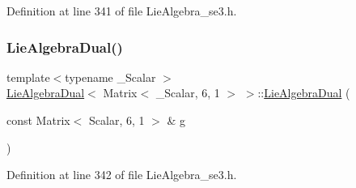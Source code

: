 Definition at line 341 of file Lie\+Algebra\+\_\+se3.\+h.

\hypertarget{class_lie_algebra_dual_3_01_matrix_3_01___scalar_00_016_00_011_01_4_01_4_a6250264c65f7681975a5683570e258e1}{}\label{class_lie_algebra_dual_3_01_matrix_3_01___scalar_00_016_00_011_01_4_01_4_a6250264c65f7681975a5683570e258e1} 
\subsubsection{\texorpdfstring{Lie\+Algebra\+Dual()}{LieAlgebraDual()}\hspace{0.1cm}{\footnotesize\ttfamily [3/5]}}
{\footnotesize\ttfamily template$<$typename \+\_\+\+Scalar $>$ \\
\hyperlink{class_lie_algebra_dual}{Lie\+Algebra\+Dual}$<$ Matrix$<$ \+\_\+\+Scalar, 6, 1 $>$ $>$\+::\hyperlink{class_lie_algebra_dual}{Lie\+Algebra\+Dual} (\begin{DoxyParamCaption}\item[{const Matrix$<$ Scalar, 6, 1 $>$ \&}]{g }\end{DoxyParamCaption})\hspace{0.3cm}{\ttfamily [inline]}}



Definition at line 342 of file Lie\+Algebra\+\_\+se3.\+h.

\hypertarget{class_lie_algebra_dual_3_01_matrix_3_01___scalar_00_016_00_011_01_4_01_4_a61842ce986294ff68257c54e8ebe6e9f}{}\label{class_lie_algebra_dual_3_01_matrix_3_01___scalar_00_016_00_011_01_4_01_4_a61842ce986294ff68257c54e8ebe6e9f} 
